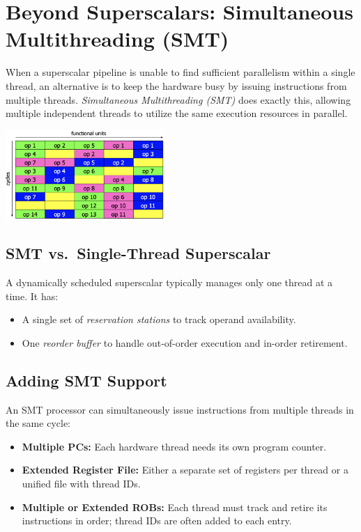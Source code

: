 \section{Beyond Superscalars: Simultaneous Multithreading (SMT)}
When a superscalar pipeline is unable to find sufficient parallelism within a single thread, an alternative is to keep the hardware busy by issuing instructions from multiple threads. \emph{Simultaneous Multithreading (SMT)} does exactly this, allowing multiple independent threads to utilize the same execution resources in parallel.

\begin{center}
    \includegraphics[width=0.45\textwidth]{chapters/chapter4f/images/smt.png}
\end{center}

\subsection*{SMT vs.\ Single-Thread Superscalar}
A dynamically scheduled superscalar typically manages only one thread at a time. It has:
\begin{itemize}
  \item A single set of \emph{reservation stations} to track operand availability.
  \item One \emph{reorder buffer} to handle out-of-order execution and in-order retirement.
\end{itemize}

\subsection*{Adding SMT Support}
An SMT processor can simultaneously issue instructions from multiple threads in the same cycle:
\begin{itemize}
  \item \textbf{Multiple PCs:} Each hardware thread needs its own program counter.
  \item \textbf{Extended Register File:} Either a separate set of registers per thread or a unified file with thread IDs.
  \item \textbf{Multiple or Extended ROBs:} Each thread must track and retire its instructions in order; thread IDs are often added to each entry.
\end{itemize}

